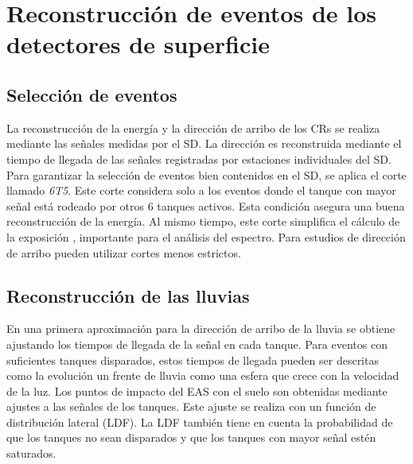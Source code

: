 \section{Reconstrucción de eventos de los detectores  de superficie}

\subsection{Selección de eventos}

La reconstrucción de la energía y la dirección de arribo de los CRs se realiza mediante las señales medidas por el SD. La dirección es reconstruida mediante  el tiempo de llegada de las señales registradas por estaciones individuales del SD. Para garantizar la selección de eventos bien contenidos en el SD, se aplica el corte llamado \emph{6T5}. Este corte considera solo a los eventos donde el tanque con mayor señal está rodeado por otros 6 tanques activos. Esta condición asegura una buena reconstrucción de la energía. Al mismo tiempo, este corte simplifica el cálculo de la exposición \cite{exposure}, importante  para el análisis del espectro. Para estudios de dirección de arribo pueden utilizar cortes menos estrictos.

\subsection{Reconstrucción de las lluvias}

En una primera aproximación para la dirección de arribo de la lluvia se obtiene ajustando los tiempos de llegada de la señal en cada tanque. Para eventos con suficientes tanques disparados, estos tiempos de llegada pueden ser descritas como la evolución un frente de lluvia como una esfera que crece con la velocidad de la luz. Los puntos de impacto del EAS con el suelo son obtenidas mediante ajustes a las señales de los tanques. Este ajuste se realiza con un función de distribución lateral (LDF). La LDF también tiene en cuenta la probabilidad de que los tanques no sean disparados y que los tanques con mayor señal estén saturados.

